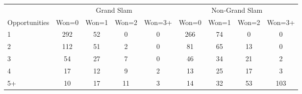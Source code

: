 \begin{tabular}{l cccc cccc}
\toprule
 & \multicolumn{4}{c}{Grand Slam} & \multicolumn{4}{c}{Non-Grand Slam} \\
\cmidrule(lr){2-5} \cmidrule(lr){6-9}
Opportunities & Won=0 & Won=1 & Won=2 & Won=3+ & Won=0 & Won=1 & Won=2 & Won=3+ \\
\midrule
1 & 292 & 52 & 0 & 0 & 266 & 74 & 0 & 0 \\
2 & 112 & 51 & 2 & 0 & 81 & 65 & 13 & 0 \\
3 & 54 & 27 & 7 & 0 & 46 & 34 & 21 & 2 \\
4 & 17 & 12 & 9 & 2 & 13 & 25 & 17 & 3 \\
5+ & 10 & 17 & 11 & 3 & 14 & 32 & 53 & 103 \\
\bottomrule
\end{tabular}
